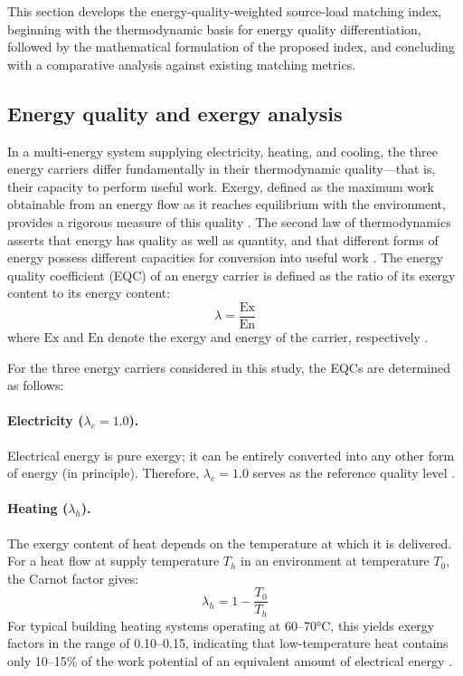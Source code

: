 This section develops the energy-quality-weighted source-load matching index, beginning with the thermodynamic basis for energy quality differentiation, followed by the mathematical formulation of the proposed index, and concluding with a comparative analysis against existing matching metrics.

\subsection{Energy quality and exergy analysis}
\label{sec:energy_quality}

In a multi-energy system supplying electricity, heating, and cooling, the three energy carriers differ fundamentally in their thermodynamic quality---that is, their capacity to perform useful work. Exergy, defined as the maximum work obtainable from an energy flow as it reaches equilibrium with the environment, provides a rigorous measure of this quality \cite{dincer2001energy,bejan2016advanced,hu2020eqc}. The second law of thermodynamics asserts that energy has quality as well as quantity, and that different forms of energy possess different capacities for conversion into useful work \cite{moran2014fundamentals}. The energy quality coefficient (EQC) of an energy carrier is defined as the ratio of its exergy content to its energy content:
\begin{equation}
    \lambda = \frac{\text{Ex}}{\text{En}}
    \label{eq:eqc_def}
\end{equation}
where $\text{Ex}$ and $\text{En}$ denote the exergy and energy of the carrier, respectively \cite{chen2022energy,ma2023exergyflex}.

For the three energy carriers considered in this study, the EQCs are determined as follows:

\paragraph{Electricity ($\lambda_e = 1.0$).} Electrical energy is pure exergy; it can be entirely converted into any other form of energy (in principle). Therefore, $\lambda_e = 1.0$ serves as the reference quality level \cite{dincer2001energy,sakulpipatsin2010exergy}.

\paragraph{Heating ($\lambda_h$).} The exergy content of heat depends on the temperature at which it is delivered. For a heat flow at supply temperature $T_h$ in an environment at temperature $T_0$, the Carnot factor gives:
\begin{equation}
    \lambda_h = 1 - \frac{T_0}{T_h}
    \label{eq:lambda_h}
\end{equation}
For typical building heating systems operating at 60--70°C, this yields exergy factors in the range of 0.10--0.15, indicating that low-temperature heat contains only 10--15\% of the work potential of an equivalent amount of electrical energy \cite{torchio2013comparison,meggers2012low,schmidt2004low}.


